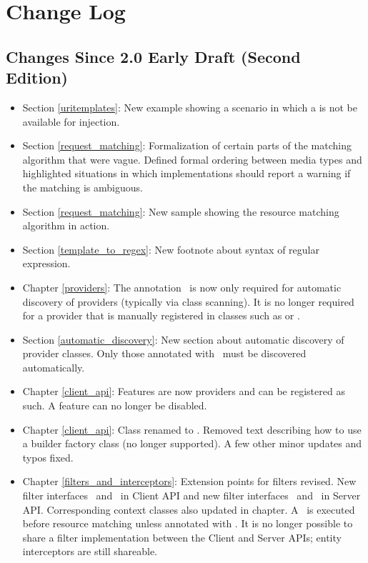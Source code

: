 \chapter{Change Log}

\section{Changes Since 2.0 Early Draft (Second Edition)}

\begin{itemize}
\item Section \ref{uritemplates}: New example showing a scenario in which a  is not be available for injection. 
\item Section \ref{request_matching}: Formalization of certain parts of the matching algorithm that were vague. Defined formal ordering between media types and highlighted situations in which implementations should report a warning if the matching is ambiguous. 
\item Section \ref{request_matching}: New sample showing the resource matching algorithm in action.
\item Section \ref{template_to_regex}: New footnote about syntax of regular expression.
\item Chapter \ref{providers}: The annotation \Provider\ is now only required for automatic discovery of providers (typically via class scanning). It is no longer required for a provider that is manually registered in classes such as  or .
\item Section \ref{automatic_discovery}: New section about automatic discovery of provider classes. Only those annotated with \Provider\ must be discovered automatically.
\item Chapter \ref{client_api}: Features are now providers and can be registered as such. A feature can no longer be disabled.
\item Chapter \ref{client_api}: Class  renamed to \WebTarget. Removed text describing how to use a builder factory class (no longer supported). A few other minor updates and typos fixed.
\item Chapter \ref{filters_and_interceptors}: Extension points for filters revised. New filter interfaces \ClientRequestFilter\ and \ClientResponseFilter\ in Client API and new filter interfaces \ContainerRequestFilter\ and \ContainerResponseFilter\ in Server API. Corresponding context classes also updated in chapter. A \ContainerRequestFilter\ is executed before resource matching unless annotated with \PostMatching. It is no longer possible to share a filter implementation between the Client and Server APIs; entity interceptors are still shareable.

\end{itemize}
